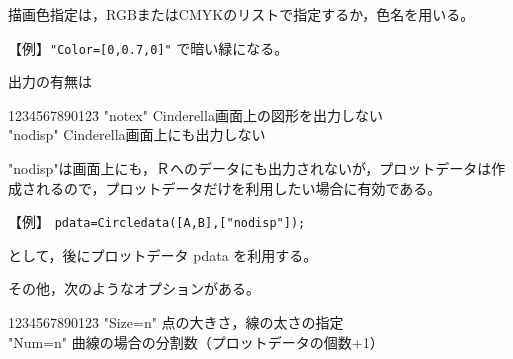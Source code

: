 \documentclass[papersize,a4paper,12pt,uplatex]{jsarticle}
\begin{document}
描画色指定は，RGBまたはCMYKのリストで指定するか，色名を用いる。

\hspace{10mm}【例】\verb|"Color=[0,0.7,0]"| で暗い緑になる。

出力の有無は
\begin{tabbing}
  1234\=567890123\=\kill
 \>    "notex"  \>Cinderella画面上の図形を出力しない\\
 \>    "nodisp" \>Cinderella画面上にも出力しない
 \end{tabbing}
 
 "nodisp"は画面上にも，Ｒへのデータにも出力されないが，プロットデータは作成されるので，プロットデータだけを利用したい場合に有効である。
 
\hspace{10mm}【例】  \verb|pdata=Circledata([A,B],["nodisp"]);|

として，後にプロットデータ pdata を利用する。

その他，次のようなオプションがある。
\begin{tabbing}
  1234\=567890123\=\kill
 \>    "Size=n"  \>点の大きさ，線の太さの指定\\
 \>    "Num=n"  \>曲線の場合の分割数（プロットデータの個数+1）\\
\end{tabbing}

\end{document}
